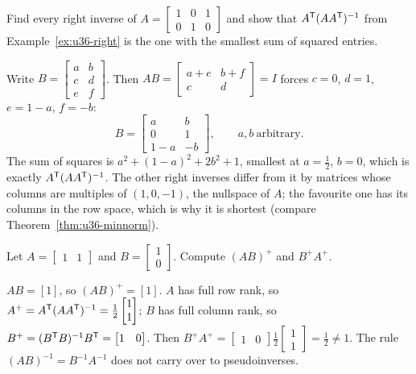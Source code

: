 \begin{exercise}\label{exr:u36-allright}
Find every right inverse of $A=\begin{bmatrix}1&0&1\\0&1&0\end{bmatrix}$ and show that $A^{\mathsf{T}}(AA^{\mathsf{T}})^{-1}$ from Example~\ref{ex:u36-right} is the one with the smallest sum of squared entries.
\end{exercise}
\begin{solution}
Write $B=\begin{bmatrix}a&b\\c&d\\e&f\end{bmatrix}$. Then $AB=\begin{bmatrix}a+e&b+f\\c&d\end{bmatrix}=I$ forces $c=0$, $d=1$, $e=1-a$, $f=-b$:
\[
B=\begin{bmatrix}a&b\\0&1\\1-a&-b\end{bmatrix},\qquad a,b\ \text{arbitrary}.
\]
The sum of squares is $a^{2}+(1-a)^{2}+2b^{2}+1$, smallest at $a=\tfrac12$, $b=0$, which is exactly $A^{\mathsf{T}}(AA^{\mathsf{T}})^{-1}$. The other right inverses differ from it by matrices whose columns are multiples of $(1,0,-1)$, the nullspace of $A$; the favourite one has its columns in the row space, which is why it is shortest (compare Theorem~\ref{thm:u36-minnorm}).
\end{solution}

\begin{exercise}\label{exr:u36-product}
Let $A=\begin{bmatrix}1&1\end{bmatrix}$ and $B=\begin{bmatrix}1\\0\end{bmatrix}$. Compute $(AB)^{+}$ and $B^{+}A^{+}$.
\end{exercise}
\begin{solution}
$AB=[1]$, so $(AB)^{+}=[1]$. $A$ has full row rank, so $A^{+}=A^{\mathsf{T}}(AA^{\mathsf{T}})^{-1}=\tfrac12\begin{bmatrix}1\\1\end{bmatrix}$; $B$ has full column rank, so $B^{+}=(B^{\mathsf{T}} B)^{-1}B^{\mathsf{T}}=\begin{bmatrix}1&0\end{bmatrix}$. Then $B^{+}A^{+}=\begin{bmatrix}1&0\end{bmatrix}\tfrac12\begin{bmatrix}1\\1\end{bmatrix}=\tfrac12\neq1$. The rule $(AB)^{-1}=B^{-1}A^{-1}$ does not carry over to pseudoinverses.
\end{solution}

